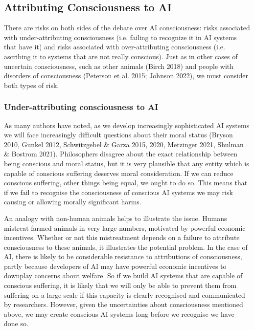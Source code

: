 \documentclass[12pt]{article}
\begin{document}
\subsection{Attributing Consciousness to AI}

There are risks on both sides of the debate over AI consciousness: risks associated with under-attributing consciousness (i.e. failing to recognize it in AI systems that have it) and risks associated with over-attributing consciousness (i.e. ascribing it to systems that are not really conscious). Just as in other cases of uncertain consciousness, such as other animals (Birch 2018) and people with disorders of consciousness (Peterson et al. 2015; Johnson 2022), we must consider both types of risk.

\subsubsection{Under-attributing consciousness to AI}

As many authors have noted, as we develop increasingly sophisticated AI systems we will face increasingly difficult questions about their moral status (Bryson 2010, Gunkel 2012, Schwitzgebel \& Garza 2015, 2020, Metzinger 2021, Shulman \& Bostrom 2021). Philosophers disagree about the exact relationship between being conscious and moral status, but it is very plausible that any entity which is capable of conscious suffering deserves moral consideration. If we can reduce conscious suffering, other things being equal, we ought to do so. This means that if we fail to recognise the consciousness of conscious AI systems we may risk causing or allowing morally significant harms.

An analogy with non-human animals helps to illustrate the issue. Humans mistreat farmed animals in very large numbers, motivated by powerful economic incentives. Whether or not this mistreatment depends on a failure to attribute consciousness to these animals, it illustrates the potential problem. In the case of AI, there is likely to be considerable resistance to attributions of consciousness, partly because developers of AI may have powerful economic incentives to downplay concerns about welfare. So if we build AI systems that are capable of conscious suffering, it is likely that we will only be able to prevent them from suffering on a large scale if this capacity is clearly recognised and communicated by researchers. However, given the uncertainties about consciousness mentioned above, we may create conscious AI systems long before we recognise we have done so.
\end{document}

